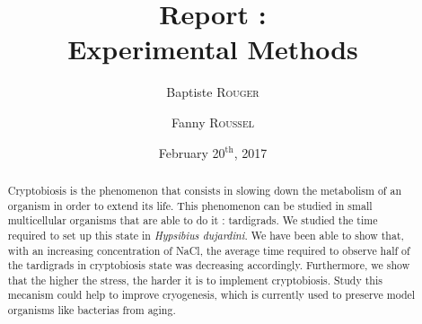 \documentclass[12pt,a4paper, twocolumn]{article}
\author{Baptiste \textsc{Rouger} \and Fanny \textsc{Roussel}}
\title{Report :\\Experimental Methods}
\date{February 20$^{\text{th}}$, 2017}
\begin{document}
\maketitle

\begin{abstract}
Cryptobiosis is the phenomenon that consists in slowing down the metabolism of an organism in order to extend its life. This phenomenon can be studied in small multicellular organisms that are able to do it : tardigrads. We studied the time required to set up this state in \textit{Hypsibius dujardini}. We have been able to show that, with an increasing concentration of NaCl, the average time required to observe half of the tardigrads in cryptobiosis state was decreasing accordingly. Furthermore, we show that the higher the stress, the harder it is to implement cryptobiosis. Study this mecanism could help to improve cryogenesis, which is currently used to preserve model organisms like bacterias from aging.
\end{abstract}

\end{document}
